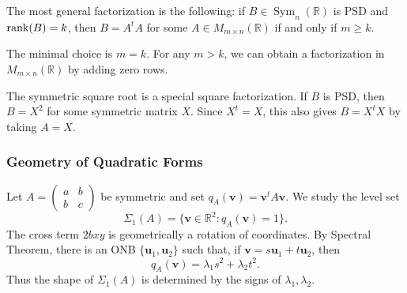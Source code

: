 \begin{remark}
The most general factorization is the following: if $B\in\operatorname{Sym}_n(\mathbb{R})$
is PSD and $\operatorname{rank}(B)=k$, then $B=A^tA$ for some
$A\in M_{m\times n}(\mathbb{R})$ if and only if $m\ge k$.

The minimal choice is $m=k$. For any $m>k$, we can obtain a factorization in
$M_{m\times n}(\mathbb{R})$ by adding zero rows.

The symmetric square root is a special square factorization. If $B$ is PSD, then
$B=X^2$ for some symmetric matrix $X$. Since $X^t=X$, this also gives
$B=X^tX$ by taking $A=X$.
\end{remark}


\subsubsection*{Geometry of Quadratic Forms}
Let $A=\begin{pmatrix}a&b\\ b&c\end{pmatrix}$ be symmetric and set
$q_A(\mathbf{v})=\mathbf{v}^tA\mathbf{v}$. We study the level set
\[
    \Sigma_1(A)=\{\mathbf{v}\in\mathbb{R}^2:q_A(\mathbf{v})=1\}.
\]
The cross term $2bxy$ is geometrically a rotation of coordinates. 
By Spectral Theorem, there is an ONB $\{\mathbf{u}_1,\mathbf{u}_2\}$ such that, if
$\mathbf{v}=s\mathbf{u}_1+t\mathbf{u}_2$, then
\[
    q_A(\mathbf{v})=\lambda_1s^2+\lambda_2t^2.
\]
Thus the shape of $\Sigma_1(A)$ is determined by the signs of
$\lambda_1,\lambda_2$.

